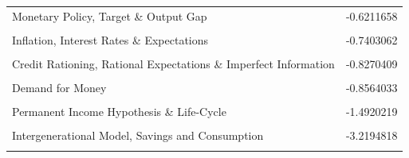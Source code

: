 \documentclass[]{elsarticle} %
\begin{document}
\begin{table}[!h]
\begin{tabular}[t]{lr}
Monetary Policy, Target \& Output Gap & -0.6211658\\
\cellcolor{gray!6}{REH, Monetary Policy \& Business Cycles} & \cellcolor{gray!6}{-0.6758668}\\
Inflation, Interest Rates \& Expectations & -0.7403062\\
\cellcolor{gray!6}{Monetary Approach of Balance of Payments} & \cellcolor{gray!6}{-0.7658536}\\
\addlinespace
Credit Rationing, Rational Expectations \& Imperfect Information & -0.8270409\\
\cellcolor{gray!6}{Inflation \& Rigidities} & \cellcolor{gray!6}{-0.8396888}\\
Demand for Money & -0.8564033\\
\cellcolor{gray!6}{New Theory of Money: Search, Bargaining...} & \cellcolor{gray!6}{-1.2139877}\\
Permanent Income Hypothesis \& Life-Cycle & -1.4920219\\
\addlinespace
\cellcolor{gray!6}{Monetary Economics \& Demand for Money} & \cellcolor{gray!6}{-1.6768415}\\
Intergenerational Model, Savings and Consumption & -3.2194818\\
\cellcolor{gray!6}{Marginal Taxation} & \cellcolor{gray!6}{-3.3179236}\\
\bottomrule
\end{tabular}
\end{table}
\end{document}

